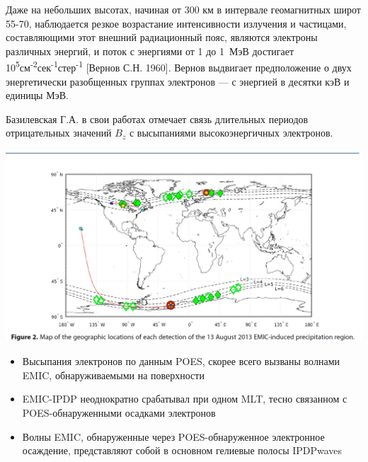 \documentclass[t, aspectratio=43]{beamer}
\begin{document}
\begin{frame}	
\frametitle{\insertsection} 

{\tiny Даже на небольших высотах, начиная от 300 км в интервале геомагнитных широт 55-70, наблюдается резкое возрастание интенсивности излучения и частицами, составляющими этот внешний радиационный пояс, являются электроны различных энергий, и поток  с энергиями от 1 до 1~МэВ достигает 10\textsuperscript{5}см\textsuperscript{-2}сек\textsuperscript{-1}стер\textsuperscript{-1} [Вернов С.Н. 1960].  Вернов выдвигает предположение о двух энергетически разобщенных группах электронов --- с энергией в десятки кэВ и единицы МэВ. 
	
Базилевская Г.А. в свои работах отмечает связь длительных периодов отрицательных значений $ B_z $ с высыпаниями высокоэнергичных электронов.

\center \includegraphics[width=0.5\linewidth]{images/poesemic}
 
\begin{itemize}
	\item Высыпания электронов по данным POES, скорее всего вызваны волнами EMIC, обнаруживаемыми на поверхности 
	\item EMIC-IPDP неоднократно срабатывал при одном MLT, тесно связанном с POES-обнаруженными осадками электронов
	\item Волны EMIC, обнаруженные через POES-обнаруженное электронное осаждение, представляют собой в основном гелиевые полосы IPDPwaves
\end{itemize}
}
\end{frame}
	
\end{document}
